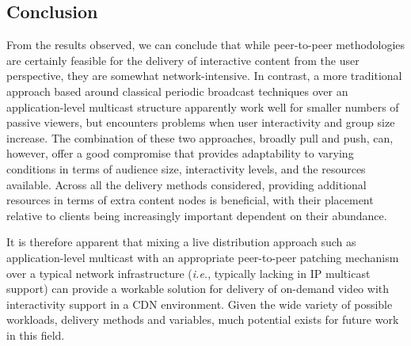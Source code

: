 \subsection{Conclusion}

From the results observed, we can conclude that while peer-to-peer methodologies are certainly feasible for the delivery of interactive content from the user perspective, they are somewhat network-intensive. In contrast, a more traditional approach based around classical periodic broadcast techniques over an application-level multicast structure apparently work well for smaller numbers of passive viewers, but encounters problems when user interactivity and group size increase. The combination of these two approaches, broadly pull and push, can, however, offer a good compromise that provides adaptability to varying conditions in terms of audience size, interactivity levels, and the resources available. Across all the delivery methods considered, providing additional resources in terms of extra content nodes is beneficial, with their placement relative to clients being increasingly important dependent on their abundance.

It is therefore apparent that mixing a live distribution approach such as application-level multicast with an appropriate peer-to-peer patching mechanism over a typical network infrastructure (\emph{i.e.}, typically lacking in IP multicast support) can provide a workable solution for delivery of on-demand video with interactivity support in a CDN environment. Given the wide variety of possible workloads, delivery methods and variables, much potential exists for future work in this field.
